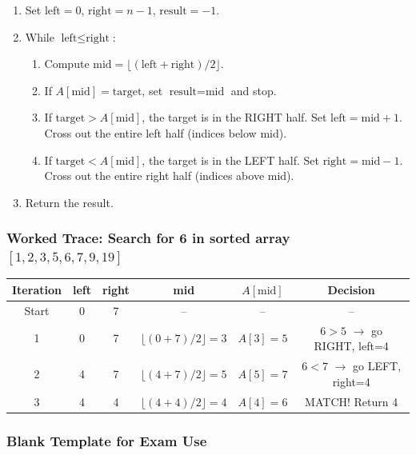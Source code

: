 \documentclass[12pt,portrait]{article}
\begin{document}
\begin{rulebox}
\begin{enumerate}[leftmargin=*]
    \item Set $\text{left} = 0$, $\text{right} = n-1$, $\text{result} = -1$.
    \item While $\text{left} \leq \text{right}$:
    \begin{enumerate}
        \item Compute $\text{mid} = \lfloor(\text{left} + \text{right}) / 2\rfloor$.
        \item If $A[\text{mid}] = \text{target}$, set $\text{result} = \text{mid}$ and stop.
        \item If $\text{target} > A[\text{mid}]$, the target is in the RIGHT half. Set $\text{left} = \text{mid} + 1$. Cross out the entire left half (indices below mid).
        \item If $\text{target} < A[\text{mid}]$, the target is in the LEFT half. Set $\text{right} = \text{mid} - 1$. Cross out the entire right half (indices above mid).
    \end{enumerate}
    \item Return the result.
\end{enumerate}
\end{rulebox}

\subsubsection{Worked Trace: Search for 6 in sorted array $[1,2,3,5,6,7,9,19]$}

\begin{center}
\begin{tabular}{c|c|c|c|c|c}
\toprule
\textbf{Iteration} & \textbf{left} & \textbf{right} & \textbf{mid} & $A[\text{mid}]$ & \textbf{Decision} \\
\midrule
Start & 0 & 7 & -- & -- & -- \\
1 & 0 & 7 & $\lfloor(0+7)/2\rfloor = 3$ & $A[3]=5$ & $6 > 5$ $\to$ go RIGHT, left=4 \\
2 & 4 & 7 & $\lfloor(4+7)/2\rfloor = 5$ & $A[5]=7$ & $6 < 7$ $\to$ go LEFT, right=4 \\
3 & 4 & 4 & $\lfloor(4+4)/2\rfloor = 4$ & $A[4]=6$ & MATCH! Return 4 \\
\bottomrule
\end{tabular}
\end{center}

\subsubsection{Blank Template for Exam Use}
\end{document}
